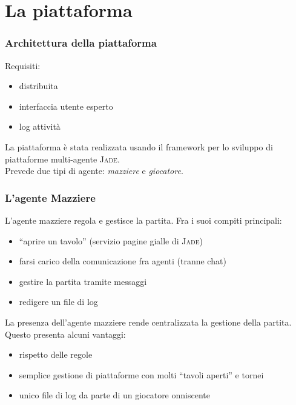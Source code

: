 \documentclass{beamer}
\newcommand*\lista{\item[$\diamondsuit$]}
\begin{document}
\section{La piattaforma}

\begin{frame}
   \frametitle{Architettura della piattaforma}
   Requisiti:
   \begin{itemize}
      \lista distribuita
      \lista interfaccia utente esperto
      \lista log attività
   \end{itemize}
   \vfill   
   \pause
   La piattaforma è stata realizzata usando il framework per lo sviluppo di piattaforme multi-agente \textsc{Jade}.\\
   Prevede due tipi di agente: \emph{mazziere} e \emph{giocatore}.
\end{frame}


\begin{frame}
   \frametitle{L'agente Mazziere}
   L'agente mazziere regola e gestisce la partita. Fra i suoi compiti principali:
   \begin{itemize}
      \pause
      \lista ``aprire un tavolo'' (servizio pagine gialle di \textsc{Jade})
      \pause
      \lista farsi carico della comunicazione fra agenti (tranne chat)
      \pause
      \lista gestire la partita tramite messaggi
      \pause
      \lista redigere un file di log
   \end{itemize}
   \vfill
   \pause
   La presenza dell'agente mazziere rende centralizzata la gestione della partita. 
   Questo presenta alcuni vantaggi:
   \begin{itemize}
      \pause
      \lista rispetto delle regole
      \pause
      \lista semplice gestione di piattaforme con molti ``tavoli aperti'' e tornei
      \pause
      \lista unico file di log da parte di un giocatore onniscente
   \end{itemize}
\end{frame}
\end{document}
